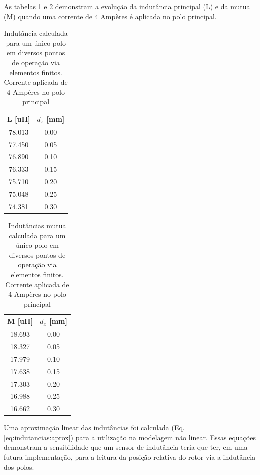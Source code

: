 As tabelas \ref{tab:dinamica:indutancia} e \ref{tab:dinamica:indutancia:mutua} demonstram a evolução da indutância principal (L) e da mutua (M) quando uma corrente de 4 Ampères é aplicada no polo principal. 

\begin{table}[ht!]
	\centering
	\begin{tabular}{c c}
        L [uH]  & $d_x$ [mm] \\
        \hline \hline               
        78.013 & 0.00 \\
        77.450 & 0.05 \\
        76.890 & 0.10 \\
        76.333 & 0.15 \\
        75.710 & 0.20 \\
        75.048 & 0.25 \\
        74.381 & 0.30       
	\end{tabular} 
	\caption{Indutância calculada para um único polo em diversos pontos de operação via elementos finitos. Corrente aplicada de 4 Ampères no polo principal}
	\label{tab:dinamica:indutancia} 
\end{table} 

\begin{table}[ht!]
	\centering
	\begin{tabular}{c c}
        M [uH]  & $d_x$ [mm] \\
        \hline \hline               
         18.693 & 0.00 \\
         18.327 & 0.05 \\
         17.979 & 0.10 \\
         17.638 & 0.15 \\
         17.303 & 0.20 \\
         16.988 & 0.25 \\
         16.662 & 0.30       
	\end{tabular} 
	\caption{Indutâncias mutua calculada para um único polo em diversos pontos de operação via elementos finitos. Corrente aplicada de 4 Ampères no polo principal}
	\label{tab:dinamica:indutancia:mutua} 
\end{table} 

Uma aproximação linear das indutâncias foi calculada (Eq. \ref{eq:indutancias:aprox}) para a utilização na modelagem não linear. Essas equações demonstram a sensibilidade que um sensor de indutância teria que ter, em uma futura implementação, para a leitura da posição relativa do rotor via a indutância dos polos.

